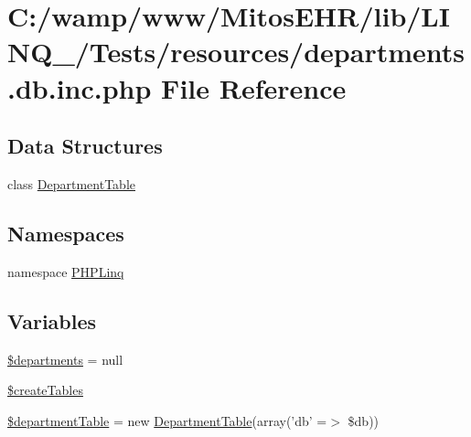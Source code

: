 \hypertarget{departments_8db_8inc_8php}{\section{\-C\-:/wamp/www/\-Mitos\-E\-H\-R/lib/\-L\-I\-N\-Q\-\_/\-Tests/resources/departments.db.\-inc.\-php \-File \-Reference}
\label{departments_8db_8inc_8php}
}
\subsection*{\-Data \-Structures}
\begin{DoxyCompactItemize}
\item 
class \hyperlink{class_department_table}{\-Department\-Table}
\end{DoxyCompactItemize}
\subsection*{\-Namespaces}
\begin{DoxyCompactItemize}
\item 
namespace \hyperlink{namespace_p_h_p_linq}{\-P\-H\-P\-Linq}
\end{DoxyCompactItemize}
\subsection*{\-Variables}
\begin{DoxyCompactItemize}
\item 
\hyperlink{departments_8db_8inc_8php_ae2ea4305886b612a4ca8efa178aaec9c}{\$departments} = null
\item 
\hyperlink{departments_8db_8inc_8php_a357d57bd32f1b2ca29a9674741f44fd3}{\$create\-Tables}
\item 
\hyperlink{departments_8db_8inc_8php_a5f957d1183dd8067ec2cde9eaedb50de}{\$department\-Table} = new \hyperlink{class_department_table}{\-Department\-Table}(array('db' =$>$ \$db))
\end{DoxyCompactItemize}


